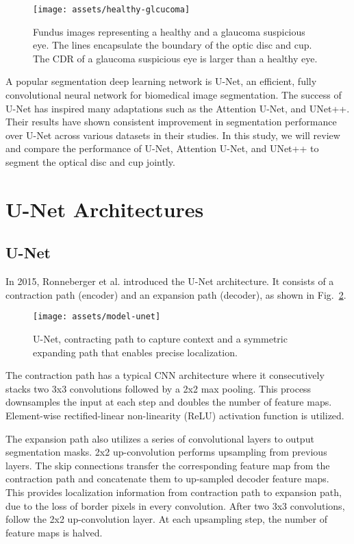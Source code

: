 \documentclass[conference]{IEEEtran}
\begin{document}
\begin{figure}[h]
\centerline{\texttt{[image: assets/healthy-glcucoma]}}
\caption{Fundus images representing a healthy and a glaucoma suspicious eye. The lines encapsulate the boundary of the optic disc and cup. The CDR of a glaucoma suspicious eye is larger than a healthy eye.}
\label{fig_eye}
\end{figure}

A popular segmentation deep learning network is U-Net\cite{ronneberger2015u}, an efficient, fully convolutional neural network for biomedical image segmentation. The success of U-Net has inspired many adaptations such as the Attention U-Net\cite{oktay2018attention}, and UNet++\cite{zhou2018unet++}. Their results have shown consistent improvement in segmentation performance over U-Net across various datasets in their studies. In this study, we will review and compare the performance of U-Net, Attention U-Net, and UNet++ to segment the optical disc and cup jointly.

\section{U-Net Architectures}

\subsection{U-Net}

In 2015, Ronneberger et al. introduced the U-Net\cite{ronneberger2015u} architecture. It consists of a contraction path (encoder) and an expansion path (decoder), as shown in Fig.~\ref{fig_unet}.

\begin{figure}[h]
\centerline{\texttt{[image: assets/model-unet]}}
\caption{U-Net, contracting path to capture context and a symmetric expanding path that enables precise localization.}
\label{fig_unet}
\end{figure}

The contraction path has a typical CNN architecture where it consecutively stacks two 3x3 convolutions followed by a 2x2 max pooling. This process downsamples the input at each step and doubles the number of feature maps. Element-wise rectified-linear non-linearity (ReLU) activation function is utilized.

The expansion path also utilizes a series of convolutional layers to output segmentation masks. 2x2 up-convolution performs upsampling from previous layers. The skip connections transfer the corresponding feature map from the contraction path and concatenate them to up-sampled decoder feature maps. This provides localization information from contraction path to expansion path, due to the loss of border pixels in every convolution. After two 3x3 convolutions, follow the 2x2 up-convolution layer. At each upsampling step, the number of feature maps is halved.
\end{document}
